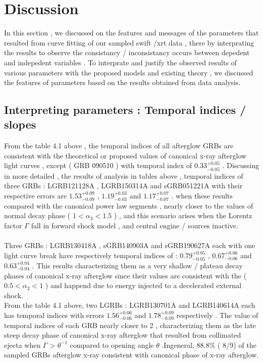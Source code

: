 \section{Discussion}
In this  section , we  discussed  on   the  features  and messages  of  the parameters  that  resulted  from  curve  fitting   of our  sampled  swift /xrt data     , there  by  interprating  the  results  to  observe  the  consistancy /   inconsistancy   occurs  between  depedent   and   indepedent  variables .    
To interprate  and  justify  the  observed   results of  various  parameters   with the  proposed  models  and  existing  theory ,  we  discussed  the   features  of  parameters   based  on  the  results  obtained  from  data  analysis.       
\subsection{Interpreting  parameters : Temporal indices / slopes }
From   the   table  4.1  above ,   the  temporal  indices   of   all  afterglow  GRBs  are consistent   with   the   theoretical  or  proposed  values  of   canonical  x-ray   afterglow  light  curves ,    except ( GRB 090510 )  with  temporal  index  of  $ 0.33^{+0.05}_{-0.05} $ . Discussing  in  more  detailed , the  results  of  analysis  in tables  above ,  temporal indices  of  three  GRBs   : LGRB121128A  ,  LGRB150314A  and sGRB051221A   with  their  respective  errors   are   $ 1.53^{+0.09}_{-0.09}$  , $ 1.19^{+0.03}_{-0.03} $  and  $ 1.17^{+0.07} _{-0.07}$ . when  these  results   compared  with  the  canonical power  law  segments ,   nearly   closer   to  the  values   of  normal decay phase  ( $1 < \alpha_{3} < 1.5 $ ) ,  and  this   scenario   arises  when  the  Lorentz  factor $ \Gamma $  fall  in  forward  shock  model , and  central  engine / sources  inactive.\\\\
 Three  GRBs : LGRB130418A  ,   sGRB140903A   and   sGRB190627A   each   with    one  light  curve  break   have  respectively  temporal indices   of : $ 0.79^{+0.05}_{-0.05}$ , $ 0.67^{+0.06}_{-0.06} $ and $ 0.63^{+0.04}_{-0.04} $  . This  results characterizing  them   as   a very  shallow  / plateau  decay phases  of canonical  x-ray  afterglow  since  their  values   are  consistent  with   the   ( $ 0.5 < \alpha_{2}< 1 $ )  and   happend    due  to   energy  injected  to  a  decelerated external shock. \\ 
From  the  table  4.1  above, two  LGRBs : LGRB130701A  and LGRB140614A   each  has  temporal  indices   with  errors   $ 1.56^{+ 0.06} _{-0.06}$  and  $ 1.78^{+0.09}_{-0.09} $  respectively . The  value of  temporal   indices   of   each   GRB   nearly    closer  to  2 ,   characterizing  them   as  the  late   steep  decay  phase  of   canonical  x-ray  afterglow   that  resulted  from   collimated   ejecta  when $ \Gamma $  > $\theta ^{-1}$ compared to opening  angle $\theta$ .Ingeneral, 88.8\% ( 8/9)  of  the  sampled   GRBs  afterglow  x-ray  consistent   with  canonical  phase  of  x-ray  afterglow.
